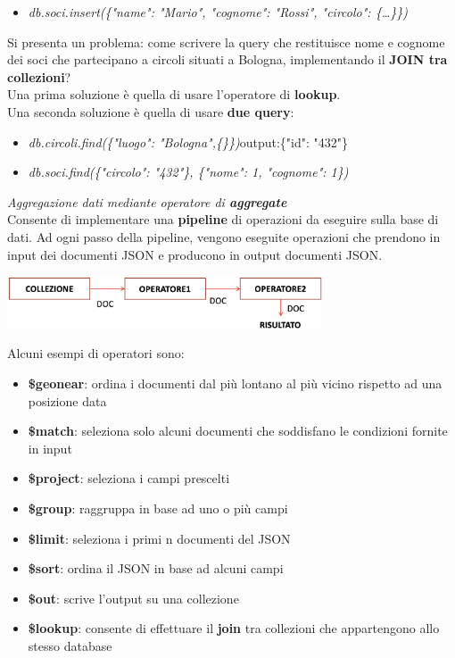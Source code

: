 \documentclass{article}
\begin{document}
\begin{itemize}[label={ }, leftmargin=1cm]
    \itemsep0em
    \item \textit{db.soci.insert(\{"name": "Mario", "cognome": "Rossi", "circolo": \{\dots\}\})}
\end{itemize}
Si presenta un problema: come scrivere la query che restituisce nome e cognome dei soci che partecipano a circoli situati a Bologna, implementando il \textbf{JOIN tra collezioni}?\\
Una prima soluzione è quella di usare l'operatore di \textbf{lookup}.\\
Una seconda soluzione è quella di usare \textbf{due query}:
\begin{itemize}[label={ }, leftmargin=1cm]
    \itemsep0em
    \item \textit{db.circoli.find(\{"luogo": "Bologna",\{\}\})}\quad output:\{"\textunderscore id": "432"\}
    \item \textit{db.soci.find(\{"circolo": "432"\}, \{"nome": 1, "cognome": 1\})}\\
\end{itemize}
\textit{Aggregazione dati mediante operatore di \textbf{aggregate}}\\
Consente di implementare una \textbf{pipeline} di operazioni da eseguire sulla base di dati. Ad ogni passo della pipeline, vengono eseguite operazioni che prendono in input dei documenti JSON e producono in output documenti JSON.
\begin{center}
    \includegraphics[width=0.7\textwidth]{foto 5.png}\vspace{14pt}\\
\end{center}
Alcuni esempi di operatori sono:
\begin{itemize}[label={-}, leftmargin=1cm]
    \itemsep0em
    \item \textbf{\$geonear}: ordina i documenti dal più lontano al più vicino rispetto ad una posizione data
    \item \textbf{\$match}: seleziona solo alcuni documenti che soddisfano le condizioni fornite in input
    \item \textbf{\$project}: seleziona i campi prescelti
    \item \textbf{\$group}: raggruppa in base ad uno o più campi
    \item \textbf{\$limit}: seleziona i primi n documenti del JSON
    \item \textbf{\$sort}: ordina il JSON in base ad alcuni campi
    \item \textbf{\$out}: scrive l'output su una collezione
    \item \textbf{\$lookup}: consente di effettuare il \textbf{join} tra collezioni che appartengono allo stesso database\\
\end{itemize}
\end{document}
